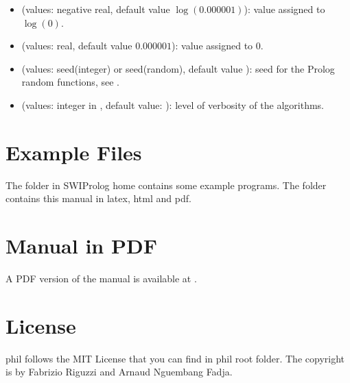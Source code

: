 \documentclass[letterpaper,10pt,english]{sphinxmanual}
\begin{document}
\begin{itemize}
\begin{itemize}
\item {} 
\sphinxAtStartPar
{} (values: negative real, default value \(\log(0.000001)\)): value assigned to \(\log(0)\).

\item {} 
\sphinxAtStartPar
{} (values: real, default value \(0.000001\)): value assigned to \(0\).

\item {} 
\sphinxAtStartPar
{} (values: seed(integer) or seed(random), default value ): seed for the Prolog random functions, see  .

\item {} 
\sphinxAtStartPar
{} (values: integer in \sphinxcode{\sphinxupquote{{[}1,4{]}}}, default value: ): level of verbosity of the algorithms.

\end{itemize}

\end{itemize}


\chapter{Example Files}
\label{\detokenize{index:example-files}}
\sphinxAtStartPar
The  folder in SWI\sphinxhyphen{}Prolog home contains some example programs.
The  folder contains this manual in latex, html and pdf.


\chapter{Manual in PDF}
\label{\detokenize{index:manual-in-pdf}}
\sphinxAtStartPar
A PDF version of the manual is available at .


\chapter{License}
\label{\detokenize{index:license}}
\sphinxAtStartPar
phil follows the MIT License that you can find in phil root folder.
The copyright is by Fabrizio Riguzzi and Arnaud Nguembang Fadja.
\end{document}
